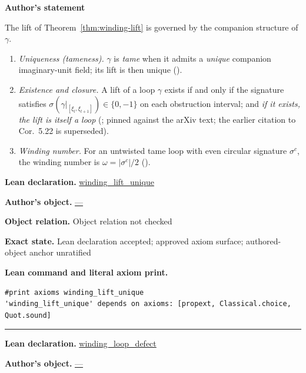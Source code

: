\documentclass[11pt]{article}
\theoremstyle{plain}
\theoremstyle{definition}
\theoremstyle{remark}
\begin{document}
\medskip
\begin{tcolorbox}[provenancecard,title={28. Proposition - Tameness, existence, and the winding number; \textbackslash{}protect\{\textbackslash{}cite[Def.\textasciitilde{}4.20, Cor.\textasciitilde{}5.21, Cor.\textasciitilde{}5.22]\{GPVwind\}\}},title after break={28. Proposition - Tameness, existence, and the winding number; \textbackslash{}protect\{\textbackslash{}cite[Def.\textasciitilde{}4.20, Cor.\textasciitilde{}5.21, Cor.\textasciitilde{}5.22]\{GPVwind\}\} (continued)}]
\textbf{Author's statement}\par
The lift of Theorem~\ref{thm:winding-lift} is governed by the companion structure of $\gamma$.
\begin{enumerate}[label=\textup{(\roman*)},leftmargin=2.6em]
\item \emph{Uniqueness (tameness).} $\gamma$ is \emph{tame} when it admits a \emph{unique} companion
  imaginary-unit field; its lift is then unique \textup{(}\cite[Def.~4.20]{GPVwind}\textup{)}.
\item \emph{Existence and closure.} A lift of a loop $\gamma$ exists if and only if the signature
  satisfies $\sigma(\gamma|_{[\xi_l,\xi_{l+1}]})\in\{0,-1\}$ on each obstruction interval; and
  \emph{if it exists, the lift is itself a loop} \textup{(}\cite[Cor.~5.13]{GPVwind}; pinned
  against the arXiv text; the earlier citation to Cor.~5.22 is superseded\textup{)}.
\item \emph{Winding number.} For an untwisted tame loop with even circular signature $\sigma^c$, the
  winding number is $\omega=|\sigma^c|/2$ \textup{(}\cite[Cor.~5.21]{GPVwind}\textup{)}.
\end{enumerate}
\tcblower
\textbf{Lean declaration.} \url{winding_lift_unique}
\par\textbf{Author's object.} \url{—}
\par\textbf{Object relation.} Object relation not checked
\par\textbf{Exact state.} Lean declaration accepted; approved axiom surface; authored-object anchor unratified
\par\smallskip\textbf{Lean command and literal axiom print.}
\begin{Verbatim}[breaklines=true,breakanywhere=true,fontsize=\small]
#print axioms winding_lift_unique
'winding_lift_unique' depends on axioms: [propext, Classical.choice, Quot.sound]
\end{Verbatim}
\medskip\hrule\medskip
\textbf{Lean declaration.} \url{winding_loop_defect}
\par\textbf{Author's object.} \url{—}

\end{tcolorbox}
\end{document}

